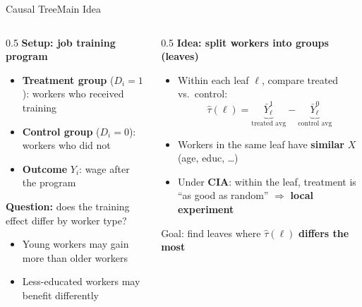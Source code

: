 \documentclass[hyperref={pdfpagelabels=false}]{beamer}
\begin{document}
\begin{frame}{Causal Tree}{Main Idea}
\begin{columns}[T]
	\begin{column}{0.5\textwidth}
		\textbf{Setup: job training program}
		\vspace{0.15cm}
		\begin{itemize}
			\item \textbf{Treatment group} ($D_i=1$): workers who received training
			\vspace{0.1cm}
			\item \textbf{Control group} ($D_i=0$): workers who did not
			\vspace{0.1cm}
			\item \textbf{Outcome} $Y_i$: wage after the program
		\end{itemize}
		\vspace{0.3cm}
		\textbf{Question:} does the training effect differ by worker type?
		\vspace{0.15cm}
		\begin{itemize}
			\item Young workers may gain more than older workers
			\item Less-educated workers may benefit differently
		\end{itemize}
	\end{column}
	\begin{column}{0.5\textwidth}
		\textbf{Idea: split workers into groups (leaves)}
		\vspace{0.15cm}
		\begin{itemize}
			\item Within each leaf $\ell$, compare treated vs.\ control:
			\[
				\hat{\tau}(\ell) = \underbrace{\bar{Y}^{1}_\ell}_{\text{treated avg}} - \underbrace{\bar{Y}^{0}_\ell}_{\text{control avg}}
			\]
			\item Workers in the same leaf have \textbf{similar} $X$ (age, educ, \ldots)
			\vspace{0.1cm}
			\item Under \textbf{CIA}: within the leaf, treatment is ``as good as random'' $\Rightarrow$ \textbf{local experiment}
		\end{itemize}
		\vspace{0.15cm}
		\small Goal: find leaves where $\hat{\tau}(\ell)$ \textbf{differs the most}
	\end{column}
\end{columns}
\end{frame}
\end{document}
